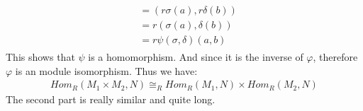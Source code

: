 \begin{enumerate}[label=]
\begin{gather*}
\begin{split}
                & = (r\sigma(a), r\delta(b)) \\
                & = r(\sigma(a), \delta(b)) \\
                & = r \psi(\sigma, \delta)(a, b)
            \end{split}
        \end{gather*}
        This shows that $\psi$ is a homomorphism. And since it is the inverse of $\varphi$, therefore $\varphi$ is an module isomorphism. Thus we have:
        \begin{gather*}
            Hom_R(M_1 \times M_2, N) \cong_R Hom_R(M_1, N) \times Hom_R(M_2, N) 
        \end{gather*}
        The second part is really similar and quite long.
\end{enumerate}